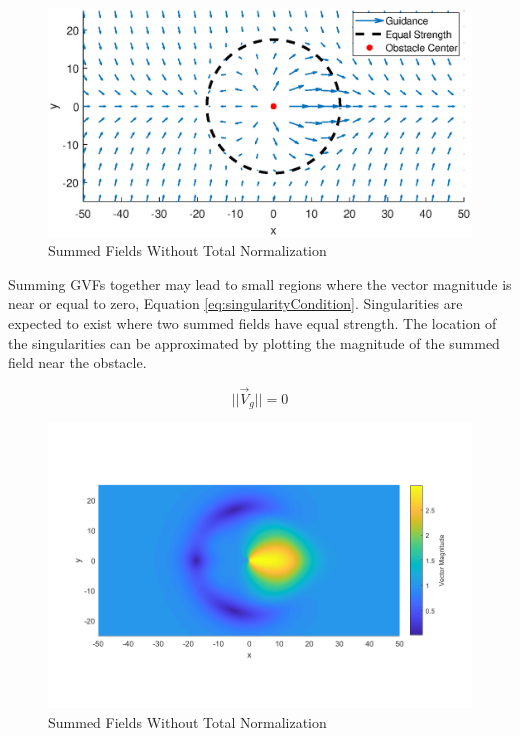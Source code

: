 \documentclass[numbered,pdftex]{ohio-etd}
\begin{document}
\begin{figure}[H]
	\centering
	\includegraphics[trim=25 35 25 50,clip,width=14cm]{PaperFigures/Methods/summedFieldsNoNorm}
	\caption{Summed Fields Without Total Normalization}
	\label{fig:summedFieldsNoNorm}
\end{figure}


Summing GVFs together may lead to small regions where the vector magnitude is near or equal to zero, Equation \ref{eq:singularityCondition}. Singularities are expected to exist where two summed fields have equal strength. The location of the singularities can be approximated by plotting the magnitude of the summed field near the obstacle. 

\begin{equation}
\label{eq:singularityCondition}
||\overrightarrow{V}_g || = 0
\end{equation}


\begin{figure}[H]
	\centering
	\includegraphics[trim=25 60 25 85,clip,width=14cm]{Figures/methods/summedHeatMapSimple}
	\caption{Summed Fields Without Total Normalization}
	\label{fig:summedHeatMap}
\end{figure}
\end{document}
